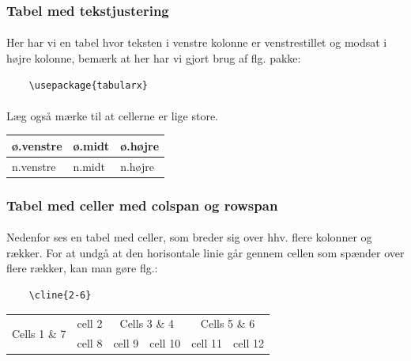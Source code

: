 \documentclass{article}
\begin{document}
\subsubsection{Tabel med tekstjustering}
\paragraph{}
Her har vi en tabel hvor teksten i venstre kolonne er venstrestillet og modsat i højre kolonne, bemærk at her har vi gjort brug af flg. pakke: 
\begin{verbatim}
    \usepackage{tabularx}\end{verbatim}
\paragraph{}
Læg også mærke til at cellerne er lige store.
\begin{center}
    \begin{tabularx}{0.6\textwidth} { 
        | >{\raggedright\arraybackslash}X 
        | >{\centering\arraybackslash}X 
        | >{\raggedleft\arraybackslash}X | }
       \hline
       ø.venstre & ø.midt & ø.højre \\
       \hline
       n.venstre  & n.midt  & n.højre  \\
      \hline
      \end{tabularx}
\end{center}
\subsubsection{Tabel med celler med colspan og rowspan}
\paragraph{}
Nedenfor ses en tabel med celler, som breder sig over hhv. flere kolonner og rækker. For at undgå at den horisontale linie går gennem cellen som spænder over flere rækker, kan man gøre flg.:
\begin{verbatim}
    \cline{2-6}
\end{verbatim}

\begin{center}    
    \begin{tabular}{|p{1.5cm}|c|c|c|c|c|}
        \hline
        \multirow{2}{*}{\parbox{1.5cm}{Cells 1 \& 7}}
        & cell 2 & \multicolumn{2}{|c|}{Cells 3 \& 4} & \multicolumn{2}{|c|}{Cells 5 \& 6} \\
        \cline{2-6}
        & cell 8 & cell 9 & cell 10 & cell 11 & cell 12 \\
        \hline
    \end{tabular}
\end{center}
\end{document}
